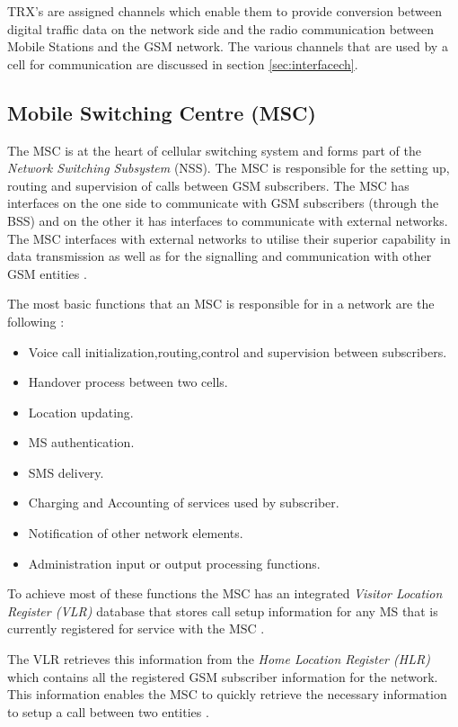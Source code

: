 TRX’s are assigned channels which enable them to provide conversion between digital traffic data on the network side and the radio communication between Mobile Stations and the GSM network\cite{ACOvsEA,FAPOrientationModel}. The various channels that are used by a cell for communication are discussed in section \ref{sec:interfacech}.

\subsection{Mobile Switching Centre (MSC)}

The MSC is at the heart of cellular switching system and forms part of the \emph{Network Switching Subsystem} (NSS). The MSC is responsible for the setting up, routing and supervision of calls between GSM subscribers\cite{GSM92,GSMSysEngin}. The MSC has interfaces on the one side to communicate with GSM subscribers (through the BSS) and on the other it has interfaces to communicate with external networks\cite{GSM92}. The MSC interfaces with external networks to utilise their superior capability in data transmission as well as for the signalling and communication with other GSM entities \cite{GSM92}. 

The most basic functions that an MSC is responsible for in a network are the following \cite{wirelesstelcoMullet}:
\begin{itemize}
\item Voice call initialization,routing,control and supervision between subscribers.
\item Handover process between two cells.
\item Location updating.
\item MS authentication.
\item SMS delivery.
\item Charging and Accounting of services used by subscriber.
\item Notification of other network elements.
\item Administration input or output processing functions.
\end{itemize}

To achieve most of these functions the MSC has an integrated \emph{Visitor Location Register (VLR)} database that stores call setup information for any MS that is currently registered for service with the MSC \cite{GSM92,wirelesstelcoMullet}. 

The VLR retrieves this information from the \emph{Home Location Register (HLR)} which contains all the registered GSM subscriber information for the network. This information enables the MSC to quickly retrieve the necessary information to setup a call between two entities \cite{GSMSysEngin,GSMSecurInTeleNetwork}.

